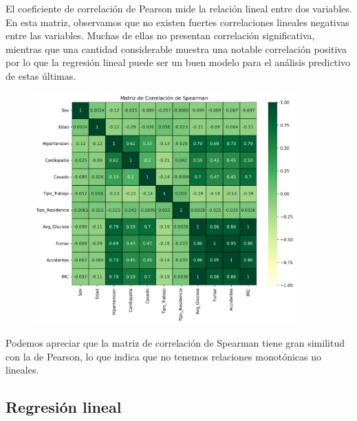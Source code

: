 \documentclass[a4paper, 12pt]{article}
\begin{document}
El coeficiente de correlación de Pearson mide la relación lineal entre dos variables. En esta matriz, 
observamos que no existen fuertes correlaciones lineales negativas entre las variables. Muchas de ellas 
no presentan correlación significativa, mientras que una cantidad considerable muestra una notable 
correlación positiva por lo que la regresión lineal puede ser un buen modelo para el análisis predictivo de estas últimas.

\begin{figure}[H]
    \centering
    \includegraphics[width=0.9\textwidth]{img/matriz_correlacion_spearman.png}
\end{figure}

Podemos apreciar que la matriz de correlación de Spearman tiene gran similitud con la de Pearson, lo que indica que no tenemos relaciones monotónicas no lineales.


\subsection{Regresión lineal}
\end{document}
